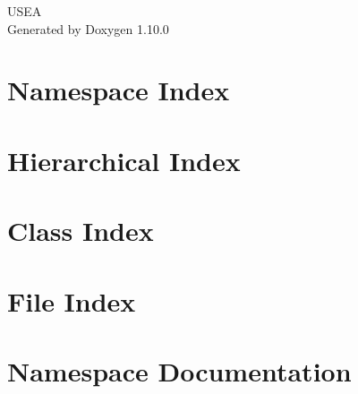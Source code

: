 \documentclass[twoside]{book}
\newcommand{\+}{\discretionary{\mbox{\scriptsize$\hookleftarrow$}}{}{}}
\newcommand{\clearemptydoublepage}{%
    \newpage{\pagestyle{empty}\cleardoublepage}%
  }
\begin{document}
  \raggedbottom
    \hypersetup{pageanchor=false,
                bookmarksnumbered=true,
                pdfencoding=unicode
               }
  \begin{titlepage}
  \vspace*{7cm}
  \begin{center}%
  {\Large USEA}\\
  \vspace*{1cm}
  {\large Generated by Doxygen 1.10.0}\\
  \end{center}
  \end{titlepage}
  \clearemptydoublepage
  \tableofcontents
  \clearemptydoublepage
  \hypersetup{pageanchor=true}
\chapter{Namespace Index}

\chapter{Hierarchical Index}

\chapter{Class Index}

\chapter{File Index}

\chapter{Namespace Documentation}













\end{document}
